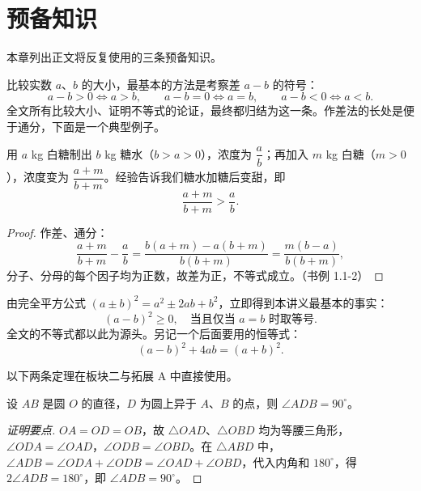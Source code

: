 \setcounter{section}{-1}
\section{预备知识}

本章列出正文将反复使用的三条预备知识。


比较实数 $a$、$b$ 的大小，最基本的方法是考察差 $a-b$ 的符号：
\[
a-b>0 \iff a>b,\qquad a-b=0 \iff a=b,\qquad a-b<0 \iff a<b.
\]
全文所有比较大小、证明不等式的论证，最终都归结为这一条。作差法的长处是便于通分，下面是一个典型例子。

\begin{proposition}[糖水不等式]
用 $a$ kg 白糖制出 $b$ kg 糖水（$b>a>0$），浓度为 $\dfrac ab$；再加入 $m$ kg 白糖（$m>0$），浓度变为 $\dfrac{a+m}{b+m}$。经验告诉我们糖水加糖后变甜，即
\[
\frac{a+m}{b+m}>\frac ab.
\]
\end{proposition}

\begin{proof}
作差、通分：
\[
\frac{a+m}{b+m}-\frac ab=\frac{b(a+m)-a(b+m)}{b(b+m)}=\frac{m(b-a)}{b(b+m)},
\]
分子、分母的每个因子均为正数，故差为正，不等式成立。（书例 1.1-2）
\end{proof}



由完全平方公式 $(a\pm b)^2=a^2\pm 2ab+b^2$，立即得到本讲义最基本的事实：
\[
(a-b)^2\ge 0,\quad\text{当且仅当 } a=b \text{ 时取等号}.
\]
全文的不等式都以此为源头。另记一个后面要用的恒等式：
\[
(a-b)^2+4ab=(a+b)^2.
\]


以下两条定理在板块二与拓展 A 中直接使用。

\begin{proposition}
设 $AB$ 是圆 $O$ 的直径，$D$ 为圆上异于 $A$、$B$ 的点，则 $\angle ADB=90^\circ$。
\end{proposition}

\begin{proof}[证明要点]
$OA=OD=OB$，故 $\triangle OAD$、$\triangle OBD$ 均为等腰三角形，$\angle ODA=\angle OAD$，$\angle ODB=\angle OBD$。在 $\triangle ABD$ 中，
$\angle ADB=\angle ODA+\angle ODB=\angle OAD+\angle OBD$，代入内角和 $180^\circ$，得 $2\angle ADB=180^\circ$，即 $\angle ADB=90^\circ$。
\end{proof}

